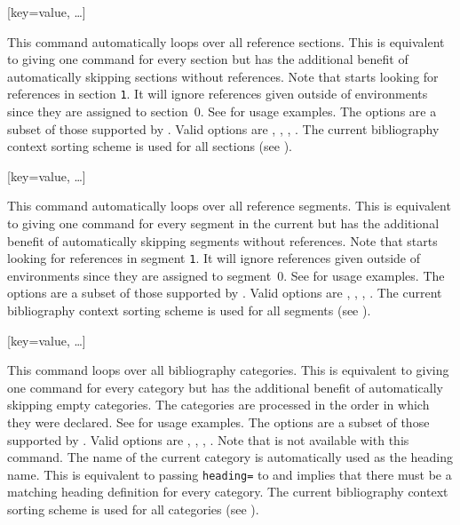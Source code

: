 \begin{ltxsyntax}

[key=value, \dots]

This command automatically loops over all reference sections. This is equivalent to giving one  command for every section but has the additional benefit of automatically skipping sections without references. Note that  starts looking for references in section \texttt{1}. It will ignore references given outside of  environments since they are assigned to section~0. See  for usage examples. The options are a subset of those supported by . Valid options are , , , . The current bibliography context sorting scheme is used for all sections (see ).

[key=value, \dots]

This command automatically loops over all reference segments. This is equivalent to giving one  command for every segment in the current  but has the additional benefit of automatically skipping segments without references. Note that  starts looking for references in segment \texttt{1}. It will ignore references given outside of  environments since they are assigned to segment~0. See  for usage examples. The options are a subset of those supported by . Valid options are , , , . The current bibliography context sorting scheme is used for all segments (see ).

[key=value, \dots]

This command loops over all bibliography categories. This is equivalent to giving one  command for every category but has the additional benefit of automatically skipping empty categories. The categories are processed in the order in which they were declared. See  for usage examples. The options are a subset of those supported by . Valid options are , , , . Note that  is not available with this command. The name of the current category is automatically used as the heading name. This is equivalent to passing \texttt{heading=} to  and implies that there must be a matching heading definition for every category. The current bibliography context sorting scheme is used for all categories (see ).


\end{ltxsyntax}
